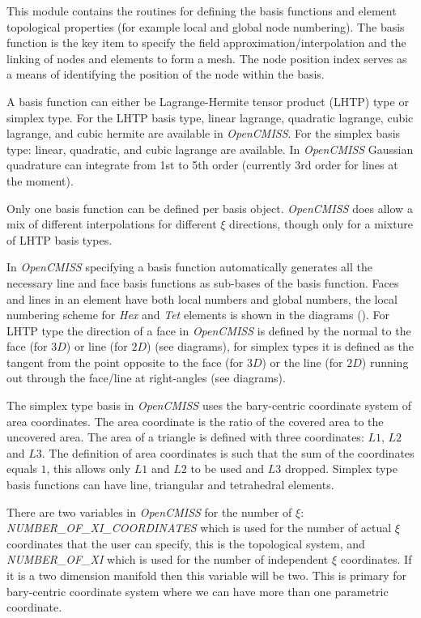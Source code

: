 This module contains the routines for defining the basis functions and element 
topological properties (for example local and global node numbering). The basis 
function is the key item to specify the field approximation/interpolation and 
the linking of nodes and elements to form a mesh. The node position index 
serves as a means of identifying the position of the node within the basis.

A basis function can either be Lagrange-Hermite tensor product (LHTP) type or 
simplex type. For the LHTP basis type, linear lagrange, quadratic lagrange, 
cubic lagrange, and cubic hermite are available in \emph{OpenCMISS}. For the 
simplex basis type: linear, quadratic, and cubic lagrange are available. In 
\emph{OpenCMISS} Gaussian quadrature can integrate from 1st to 5th order 
(currently 3rd order for lines at the moment). 

Only one basis function can be defined per basis object. \emph{OpenCMISS} does 
allow a mix of different interpolations for different $\xi$ directions, though 
only for a mixture of LHTP basis types. 

In \emph{OpenCMISS} specifying a basis function automatically generates all the 
necessary line and face basis functions as sub-bases of the basis function. 
Faces and lines in an element have both local numbers and global numbers, the 
local numbering scheme for \emph{Hex} and \emph{Tet} elements is shown in the 
diagrams (). For LHTP type the direction of a face in \emph{OpenCMISS} is defined 
by the normal to the face (for $3D$) or line (for $2D$) (see diagrams), for simplex 
types it is defined as the tangent from the point opposite to the face (for 
$3D$) or the line (for $2D$) running out through the face/line at right-angles 
(see diagrams).

The simplex type basis in \emph{OpenCMISS} uses the bary-centric coordinate 
system of area coordinates. The area coordinate is the ratio of the covered 
area to the uncovered area. The area of a triangle is defined with three 
coordinates: $L1$, $L2$ and $L3$. The definition of area coordinates is such 
that the sum of the coordinates equals $1$, this allows only $L1$ and $L2$ to 
be used and $L3$ dropped. Simplex type basis functions can have line, triangular 
and tetrahedral elements. 

There are two variables in \emph{OpenCMISS} for the number of $\xi$: \\
\emph{NUMBER\_OF\_XI\_COORDINATES} which is used for the number of 
actual $\xi$ coordinates that the user can specify, this is the topological 
system, and \emph{NUMBER\_OF\_XI} which is used for the number of independent $\xi$ 
coordinates. If it is a two dimension manifold then this variable will be two. 
This is primary for bary-centric coordinate system where we can have more than 
one parametric coordinate.

